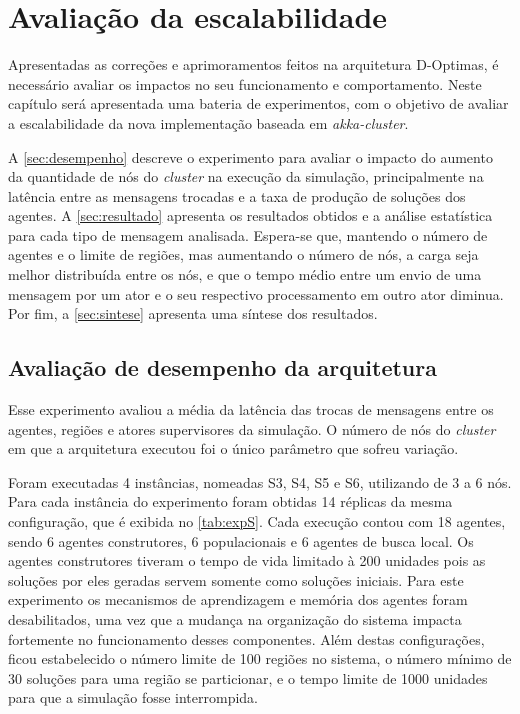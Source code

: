 

\chapter{Avaliação da escalabilidade}
\label{chap:exp_preliminares}

Apresentadas as correções e aprimoramentos feitos na arquitetura D-Optimas, é necessário avaliar os impactos no seu funcionamento e comportamento. Neste capítulo será apresentada uma  bateria de experimentos, com o objetivo de avaliar a escalabilidade da nova implementação baseada em \textit{akka-cluster}.

A \autoref{sec:desempenho} descreve o experimento para avaliar o impacto do aumento da quantidade de nós do \textit{cluster} na execução da simulação, principalmente na latência entre as mensagens trocadas e a taxa de produção de soluções dos agentes. A \autoref{sec:resultado} apresenta os resultados obtidos e a análise estatística para cada tipo de mensagem analisada. Espera-se que, mantendo o número de agentes e o limite de regiões, mas aumentando o número de nós, a carga seja melhor distribuída entre os nós, e que o tempo médio entre um envio de uma mensagem por um ator e o seu respectivo processamento em outro ator diminua. Por fim, a \autoref{sec:sintese} apresenta uma síntese dos resultados. 

\section{Avaliação de desempenho da arquitetura}
\label{sec:desempenho}

Esse experimento avaliou a média da latência das trocas de mensagens entre os agentes, regiões e atores supervisores da simulação. O número de nós do \textit{cluster} em que a arquitetura executou foi o único parâmetro que sofreu variação. 

Foram executadas 4 instâncias, nomeadas S3, S4, S5 e S6, utilizando de 3 a 6 nós. Para cada instância do experimento foram obtidas 14 réplicas da mesma configuração, que é exibida no \autoref{tab:expS}. Cada execução contou com 18 agentes, sendo 6 agentes construtores, 6 populacionais e 6 agentes de busca local. Os agentes construtores tiveram o tempo de vida limitado à 200 unidades pois as soluções por eles geradas servem somente como soluções iniciais.
Para este experimento os mecanismos de aprendizagem e memória dos agentes foram desabilitados, uma vez que a mudança na organização do sistema impacta fortemente no funcionamento desses componentes. 
Além destas configurações, ficou estabelecido o número limite de 100 regiões no sistema, o número mínimo de 30 soluções para uma região se particionar, e o tempo limite de 1000 unidades para que a simulação fosse interrompida.

